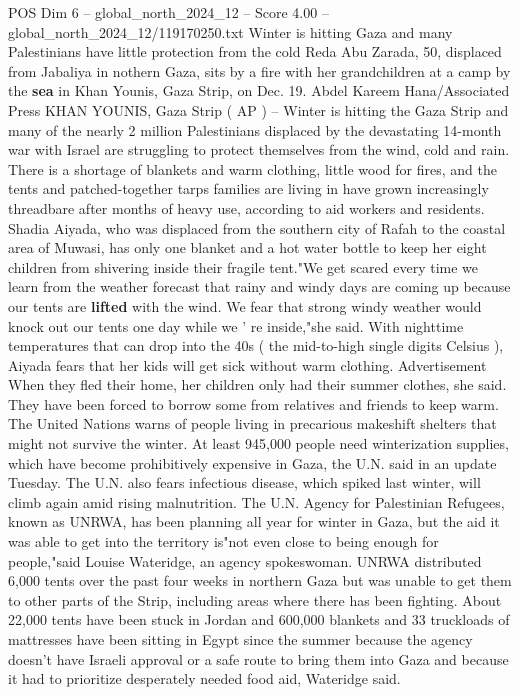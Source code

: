 \begin{textsample}{POS Dim 6 – global\_north\_2024\_12 – Score 4.00 – global\_north\_2024\_12/119170250.txt}  \label{ex:f6_pos_267}
Winter is hitting Gaza and many Palestinians have little protection from the cold Reda Abu Zarada, 50, displaced from Jabaliya in nothern Gaza, sits by a fire with her grandchildren at a camp by the \textbf{sea} in Khan Younis, Gaza Strip, on Dec. 19.
Abdel Kareem Hana/Associated Press KHAN YOUNIS, Gaza Strip ( AP ) -- Winter is hitting the Gaza Strip and many of the nearly 2 million Palestinians displaced by the devastating 14-month war with Israel are struggling to protect themselves from the wind, cold and rain.
There is a shortage of blankets and warm clothing, little wood for fires, and the tents and patched-together tarps families are living in have grown increasingly threadbare after months of heavy use, according to aid workers and residents.
Shadia Aiyada, who was displaced from the southern city of Rafah to the coastal area of Muwasi, has only one blanket and a hot water bottle to keep her eight children from shivering inside their fragile tent."We get scared every time we learn from the weather forecast that rainy and windy days are coming up because our tents are \textbf{lifted} with the wind.
We fear that strong windy weather would knock out our tents one day while we ' re inside,"she said.
With nighttime temperatures that can drop into the 40s ( the mid-to-high single digits Celsius ), Aiyada fears that her kids will get sick without warm clothing.
Advertisement When they fled their home, her children only had their summer clothes, she said.
They have been forced to borrow some from relatives and friends to keep warm.
The United Nations warns of people living in precarious makeshift shelters that might not survive the winter.
At least 945,000 people need winterization supplies, which have become prohibitively expensive in Gaza, the U.N. said in an update Tuesday.
The U.N. also fears infectious disease, which spiked last winter, will climb again amid rising malnutrition.
The U.N.
Agency for Palestinian Refugees, known as UNRWA, has been planning all year for winter in Gaza, but the aid it was able to get into the territory is"not even close to being enough for people,"said Louise Wateridge, an agency spokeswoman.
UNRWA distributed 6,000 tents over the past four weeks in northern Gaza but was unable to get them to other parts of the Strip, including areas where there has been fighting.
About 22,000 tents have been stuck in Jordan and 600,000 blankets and 33 truckloads of mattresses have been sitting in Egypt since the summer because the agency doesn't have Israeli approval or a safe route to bring them into Gaza and because it had to prioritize desperately needed food aid, Wateridge said.

\end{textsample}
